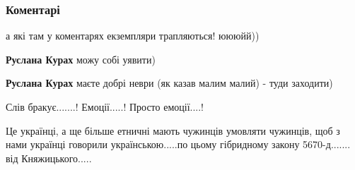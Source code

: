  
 
 
 
 
\subsubsection{Коментарі}

\begin{itemize}
 
а які там у коментарях екземпляри трапляються! юююйй))

\begin{itemize}
 
\textbf{Руслана Курах} можу собі уявити)

 
\textbf{Руслана Курах} маєте добрі неври (як казав малим малий) - туди заходити)

 

\obeycr
Слів бракує.......!
Емоції.....!
Просто емоції....!
\restorecr

Це українці, а ще більше етничні мають чужинців умовляти чужинців, щоб з нами
українці говорили українською.....по цьому гібридному закону 5670-д.......  від
Княжицького.....


\end{itemize}
\end{itemize}
